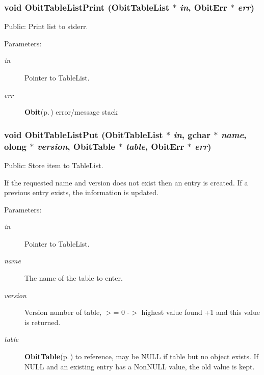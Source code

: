 \subsubsection{\setlength{\rightskip}{0pt plus 5cm}void Obit\-Table\-List\-Print ({\bf Obit\-Table\-List} $\ast$ {\em in}, {\bf Obit\-Err} $\ast$ {\em err})}\label{ObitTableList_8c_a18}


Public: Print list to stderr. 

\begin{Desc}
\item[Parameters:]
\begin{description}
\item[{\em in}]Pointer to Table\-List. \item[{\em err}]{\bf Obit}{\rm (p.\,\pageref{structObit})} error/message stack \end{description}
\end{Desc}
\subsubsection{\setlength{\rightskip}{0pt plus 5cm}void Obit\-Table\-List\-Put ({\bf Obit\-Table\-List} $\ast$ {\em in}, gchar $\ast$ {\em name}, {\bf olong} $\ast$ {\em version}, {\bf Obit\-Table} $\ast$ {\em table}, {\bf Obit\-Err} $\ast$ {\em err})}\label{ObitTableList_8c_a13}


Public: Store item to Table\-List. 

If the requested name and version does not exist then an entry is created. If a previous entry exists, the information is updated. \begin{Desc}
\item[Parameters:]
\begin{description}
\item[{\em in}]Pointer to Table\-List. \item[{\em name}]The name of the table to enter. \item[{\em version}]Version number of table, $>$= 0 -$>$ highest value found +1 and this value is returned. \item[{\em table}]{\bf Obit\-Table}{\rm (p.\,\pageref{structObitTable})} to reference, may be NULL if table but no object exists. If NULL and an existing entry has a Non\-NULL value, the old value is kept. \end{description}
\end{Desc}
